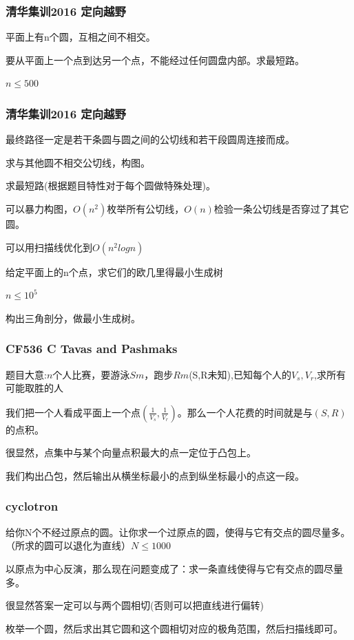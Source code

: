 \begin{frame}
\frametitle{清华集训2016 定向越野}
\pause
平面上有n个圆，互相之间不相交。

要从平面上一个点到达另一个点，不能经过任何圆盘内部。求最短路。

$n \le 500$

\end{frame}

\begin{frame}
\frametitle{清华集训2016 定向越野}
\pause
最终路径一定是若干条圆与圆之间的公切线和若干段圆周连接而成。

\pause
求与其他圆不相交公切线，构图。

\pause
求最短路(根据题目特性对于每个圆做特殊处理)。

\pause
可以暴力构图，$O(n^2)$枚举所有公切线，$O(n)$检验一条公切线是否穿过了其它圆。

\pause
可以用扫描线优化到$O(n^2logn)$
\end{frame}

\begin{frame}
\pause
给定平面上的n个点，求它们的欧几里得最小生成树

$n \le 10^5$

\pause
构出三角剖分，做最小生成树。
\end{frame}

\begin{frame}
\frametitle{CF536 C Tavas and Pashmaks}
\pause
题目大意:$n$个人比赛，要游泳$Sm$，跑步$Rm$(S,R未知),已知每个人的$V_s,V_r$,求所有可能取胜的人

\pause
我们把一个人看成平面上一个点$(\frac{1}{V_s},\frac{1}{V_r})$。那么一个人花费的时间就是与$(S,R)$的点积。

很显然，点集中与某个向量点积最大的点一定位于凸包上。

我们构出凸包，然后输出从横坐标最小的点到纵坐标最小的点这一段。
\end{frame}

\begin{frame}
\frametitle{cyclotron}
\pause
给你N个不经过原点的圆。让你求一个过原点的圆，使得与它有交点的圆尽量多。（所求的圆可以退化为直线）$N \le 1000$

\pause
以原点为中心反演，那么现在问题变成了：求一条直线使得与它有交点的圆尽量多。

\pause
很显然答案一定可以与两个圆相切(否则可以把直线进行偏转)

枚举一个圆，然后求出其它圆和这个圆相切对应的极角范围，然后扫描线即可。
\end{frame}

